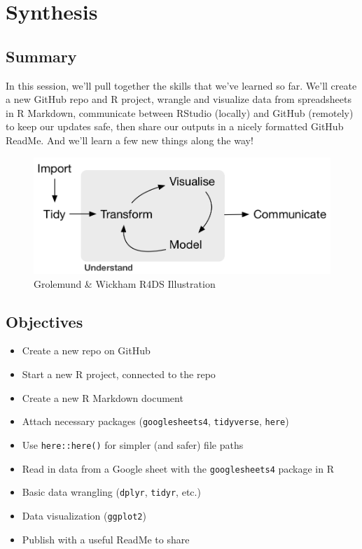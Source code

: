 \documentclass[]{book}
\providecommand{\tightlist}{%
  \setlength{\itemsep}{0pt}\setlength{\parskip}{0pt}}
\begin{document}
\hypertarget{synthesis}{%
\chapter{Synthesis}\label{synthesis}}

\hypertarget{summary-6}{%
\section{Summary}\label{summary-6}}

In this session, we'll pull together the skills that we've learned so far. We'll create a new GitHub repo and R project, wrangle and visualize data from spreadsheets in R Markdown, communicate between RStudio (locally) and GitHub (remotely) to keep our updates safe, then share our outputs in a nicely formatted GitHub ReadMe. And we'll learn a few new things along the way!

\begin{figure}
\centering
\includegraphics{img/r4ds_data-science.png}
\caption{Grolemund \& Wickham R4DS Illustration}
\end{figure}

\hypertarget{objectives-5}{%
\section{Objectives}\label{objectives-5}}

\begin{itemize}
\tightlist
\item
  Create a new repo on GitHub
\item
  Start a new R project, connected to the repo
\item
  Create a new R Markdown document
\item
  Attach necessary packages (\texttt{googlesheets4}, \texttt{tidyverse}, \texttt{here})
\item
  Use \texttt{here::here()} for simpler (and safer) file paths
\item
  Read in data from a Google sheet with the \texttt{googlesheets4} package in R
\item
  Basic data wrangling (\texttt{dplyr}, \texttt{tidyr}, etc.)
\item
  Data visualization (\texttt{ggplot2})
\item
  Publish with a useful ReadMe to share
\end{itemize}
\end{document}
